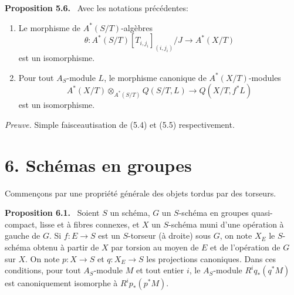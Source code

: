 \documentclass[11pt]{article}
\newenvironment{statement}[1]{\par\medskip\noindent\textbf{#1.}\ }{\par\medskip}
\begin{document}
\begin{statement}{Proposition 5.6}
Avec les notations précédentes:
\begin{enumerate}[label=\alph*)]
\item Le morphisme de $A^*(S/T)$-algèbres
\[
\theta:A^*(S/T)[T_{i,j_i}]_{(i,j_i)}/J\to A^*(X/T)
\]
est un isomorphisme.
\item Pour tout $A_S$-module $L$, le morphisme canonique de $A^*(X/T)$-modules
\[
A^*(X/T)\otimes_{A^*(S/T)}Q(S/T,L)\to Q(X/T,f^*L)
\]
est un isomorphisme.
\end{enumerate}
\end{statement}

\emph{Preuve.} Simple faisceautisation de (5.4) et (5.5) respectivement.

\section*{6. Schémas en groupes}

Commençons par une propriété générale des objets tordus par des torseurs.

\begin{statement}{Proposition 6.1}
Soient $S$ un schéma, $G$ un $S$-schéma en groupes quasi-compact, lisse et à fibres connexes, et $X$ un $S$-schéma muni d'une opération à gauche de $G$. Si $f:E\to S$ est un $S$-torseur (à droite) sous $G$, on note $X_E$ le $S$-schéma obtenu à partir de $X$ par torsion au moyen de $E$ et de l'opération de $G$ sur $X$. On note $p:X\to S$ et $q:X_E\to S$ les projections canoniques. Dans ces conditions, pour tout $A_S$-module $M$ et tout entier $i$, le $A_S$-module $R^iq_*(q^*M)$ est canoniquement isomorphe à $R^ip_*(p^*M)$.
\end{statement}
\end{document}
